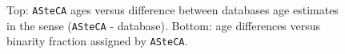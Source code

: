 \documentclass[draft]{aa}
\begin{document}
  \begin{figure}
   \caption{Top: \texttt{ASteCA} ages versus difference between databases age
   estimates in the sense (\texttt{ASteCA} - database).
   Bottom: age differences versus binarity fraction assigned by
   \texttt{ASteCA}.}
   \label{fig:ages}
  \end{figure}
\end{document}
